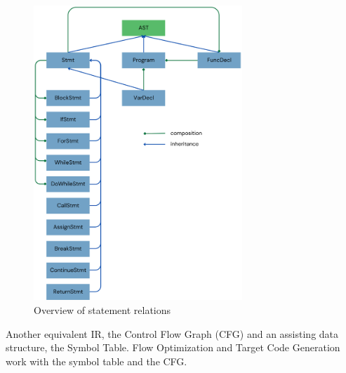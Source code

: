 \begin{figure}[ht]
    \centering
    \includegraphics[width=0.7\textwidth]{img/ast.png}
    \caption{Overview of statement relations}
    \label{figure:ast}
\end{figure}

Another equivalent IR, the Control Flow Graph (CFG) and an assisting data structure, the Symbol Table. Flow Optimization and Target Code Generation work with the symbol table and the CFG.